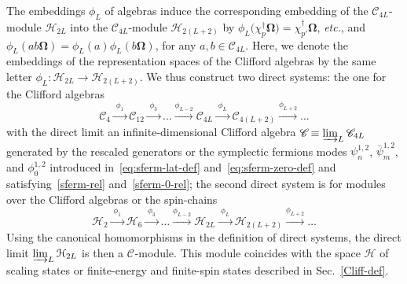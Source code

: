 \documentclass[11pt]{article}
\newcommand{\sferm}{\psi}
\newcommand{\bsferm}{\bar{\psi}}
\newcommand{\Hilb}{\mathcal{H}}
\newcommand{\vac}{\boldsymbol{\Omega}}
\newcommand{\Clif}[1]{\mathscr{C}_{#1}}
\theoremstyle{definition}
\begin{document}
 The embeddings $\phi_L$ of algebras induce the corresponding embedding of the $\Clif{4L}$-module $\Hilb_{2L}$  into the $\Clif{4L}$-module $\Hilb_{2(L+2)}$ by $\phi_L\bigl(\chi^{\dagger}_{p}\vac\bigr) = \chi^{\dagger}_{p'}\vac$,
  {\it etc.}, and $\phi_L(ab\vac) = \phi_L(a)\phi_L(b\vac)$, for any $a,b\in\Clif{4L}$. Here, we denote the embeddings of the representation spaces of the Clifford algebras by the same letter $\phi_L:\Hilb_{2L}\to\Hilb_{2(L+2)}$. We thus construct two direct systems: the one for the Clifford algebras
\begin{equation*}
\Clif{4}\xrightarrow{\;\phi_1\;}\Clif{12}\xrightarrow{\;\phi_3\;}\dots\xrightarrow{\phi_{L-2}}\Clif{4L}\xrightarrow{\;\phi_{L}\;}\Clif{4(L+2)}\xrightarrow{\phi_{L+2}}\dots
\end{equation*}
with the direct limit an infinite-dimensional Clifford algebra $\Clif{}\equiv\varinjlim_L \Clif{4L}$ generated by the rescaled generators or the symplectic fermions modes $\sferm^{1,2}_n$, $\bsferm^{1,2}_m$, and $\phi^{1,2}_0$ introduced in~\eqref{eq:sferm-lat-def} and~\eqref{eq:sferm-zero-def} and satisfying~\eqref{sferm-rel} and~\eqref{sferm-0-rel}; the second direct system is for modules over the Clifford algebras or the spin-chains
\begin{equation}\label{eq:Hilb-direct-sys}
\Hilb_{2}\xrightarrow{\;\phi_1\;}\Hilb_{6}\xrightarrow{\;\phi_3\;}\dots\xrightarrow{\phi_{L-2}}\Hilb_{2L}\xrightarrow{\;\phi_{L}\;}\Hilb_{2(L+2)}\xrightarrow{\phi_{L+2}}\dots
\end{equation}
Using the canonical homomorphisms in the definition of direct systems, the direct limit $\varinjlim_L \Hilb_{2L}$ is then a $\Clif{}$-module. This module coincides with the space $\Hilb$ of scaling states or finite-energy and finite-spin states described  in Sec.~\ref{Cliff-def}.
\end{document}
